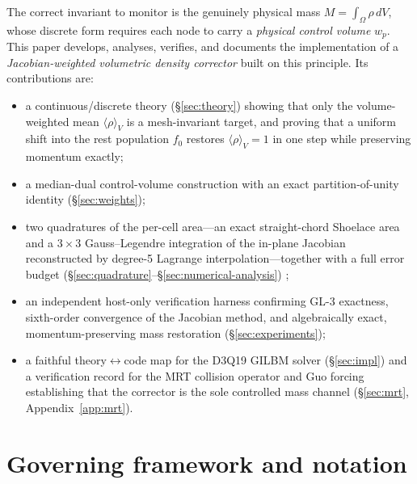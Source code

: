 \documentclass[11pt]{article}
\theoremstyle{definition}
\theoremstyle{remark}
\begin{document}
The correct invariant to monitor is the genuinely physical mass
$M=\int_\Omega\rho\,dV$, whose discrete form requires each node to carry a
\emph{physical control volume} $w_p$. This paper develops, analyses, verifies,
and documents the implementation of a \emph{Jacobian-weighted volumetric density
corrector} built on this principle. Its contributions are:
\begin{itemize}
\item a continuous/discrete theory (\S\ref{sec:theory}) showing that only the
  volume-weighted mean $\langle\rho\rangle_V$ is a mesh-invariant target, and
  proving that a uniform shift into the rest population $f_0$ restores
  $\langle\rho\rangle_V=1$ in one step while preserving momentum exactly;
\item a median-dual control-volume construction with an exact
  partition-of-unity identity (\S\ref{sec:weights});
\item two quadratures of the per-cell area---an exact straight-chord Shoelace
  area and a $3\times3$ Gauss--Legendre integration of the in-plane Jacobian
  reconstructed by degree-5 Lagrange interpolation---together with a full error
  budget (\S\ref{sec:quadrature}--\S\ref{sec:numerical-analysis})
  \cite{StoerBulirsch2002,DavisRabinowitz1984};
\item an independent host-only verification harness confirming GL-3 exactness,
  sixth-order convergence of the Jacobian method, and algebraically exact,
  momentum-preserving mass restoration (\S\ref{sec:experiments});
\item a faithful theory$\leftrightarrow$code map for the D3Q19 GILBM solver
  (\S\ref{sec:impl}) and a verification record for the MRT collision operator and
  Guo forcing \cite{GuoZhengShi2002} establishing that the corrector is the sole
  controlled mass channel (\S\ref{sec:mrt}, Appendix~\ref{app:mrt}).
\end{itemize}

\section{Governing framework and notation}
\label{sec:framework}
\end{document}
